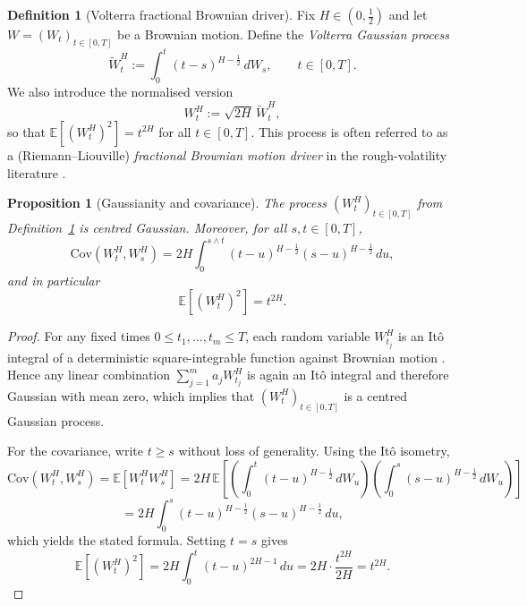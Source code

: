 \documentclass[12pt,a4paper]{article}
\theoremstyle{definition}
\newtheorem{definition}{Definition}[section]
\theoremstyle{plain}
\newtheorem{proposition}{Proposition}[section]
\theoremstyle{remark}
\theoremstyle{plain}
\begin{document}
\begin{definition}[Volterra fractional Brownian driver]
\label{def:volterra_driver}
Fix $H\in(0,\tfrac12)$ and let $W=(W_t)_{t\in[0,T]}$ be a Brownian motion. 
Define the \emph{Volterra Gaussian process}
\[
    \widetilde W^H_t
    :=
    \int_0^t (t-s)^{H-\frac12}\, dW_s,
    \qquad t\in[0,T].
\]
We also introduce the normalised version
\[
    W^H_t := \sqrt{2H}\,\widetilde W^H_t,
\]
so that $\mathbb E[(W^H_t)^2]=t^{2H}$ for all $t\in[0,T]$.
This process is often referred to as a (Riemann--Liouville) \emph{fractional Brownian motion driver} in the rough-volatility literature \cite{GatheralRough,BayerFriz2016}.
\end{definition}

\begin{proposition}[Gaussianity and covariance]
\label{prop:gaussian_covariance}
The process $(W^H_t)_{t\in[0,T]}$ from Definition~\ref{def:volterra_driver} is centred Gaussian. Moreover, for all $s,t\in[0,T]$,
\[
    \mathrm{Cov}(W^H_t,W^H_s)
    =
    2H \int_0^{s\wedge t} (t-u)^{H-\frac12}(s-u)^{H-\frac12}\, du,
\]
and in particular
\[
    \mathbb E[(W^H_t)^2]=t^{2H}.
\]
\end{proposition}

\begin{proof}
For any fixed times $0\le t_1,\dots,t_m\le T$, each random variable $W^H_{t_j}$ is an It\^o integral of a deterministic square-integrable function against Brownian motion \cite{GatheralRough,BayerFriz2016}. 
Hence any linear combination $\sum_{j=1}^m a_j W^H_{t_j}$ is again an It\^o integral and therefore Gaussian with mean zero, which implies that $(W^H_t)_{t\in[0,T]}$ is a centred Gaussian process.

For the covariance, write $t\ge s$ without loss of generality. Using the It\^o isometry,
\[
    \mathrm{Cov}(W^H_t,W^H_s)
    =
    \mathbb E[W^H_t W^H_s]
    =
    2H\,\mathbb E\!\left[
        \left(\int_0^t (t-u)^{H-\frac12}\, dW_u\right)
        \left(\int_0^s (s-u)^{H-\frac12}\, dW_u\right)
    \right]
\]
\[
    =
    2H \int_0^{s} (t-u)^{H-\frac12}(s-u)^{H-\frac12}\, du,
\]
which yields the stated formula. Setting $t=s$ gives
\[
    \mathbb E[(W^H_t)^2]
    =
    2H \int_0^{t} (t-u)^{2H-1}\, du
    =
    2H \cdot \frac{t^{2H}}{2H}
    =
    t^{2H}.
\]
\end{proof}
\end{document}
